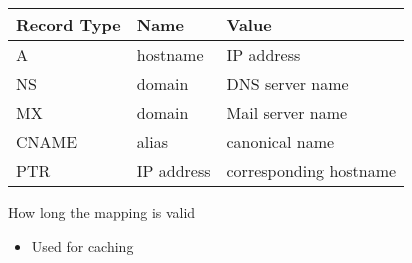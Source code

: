 \begin{itemize}
\begin{itemize}
\begin{itemize}
                        \begin{tabular}{l l l}
                            Record Type & Name & Value\\
                            \hline
                            A & hostname & IP address\\
                            NS & domain & DNS server name\\
                            MX & domain & Mail server name\\
                            CNAME & alias & canonical name\\
                            PTR & IP address & corresponding hostname
                        \end{tabular}
                     How long the mapping is valid
                        \begin{itemize}
                            \item Used for caching
                        \end{itemize}
                \end{itemize}
        \end{itemize}
\end{itemize}

